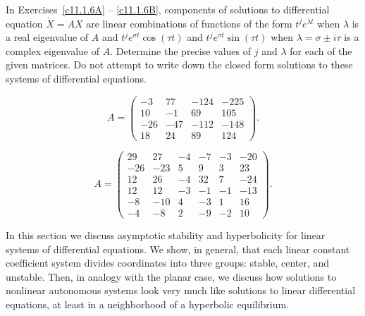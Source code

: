 In Exercises~\ref{c11.1.6A} -- \ref{c11.1.6B}, components of solutions to 
differential equation $\dot{X}=AX$ are linear combinations of functions of 
the form $t^je^{\lambda t}$ when $\lambda$ is a real eigenvalue of $A$ and 
$t^je^{\sigma t}\cos(\tau t)$ and $t^je^{\sigma t}\sin(\tau t)$ when
$\lambda=\sigma\pm i\tau$ is a complex eigenvalue of $A$.  Determine the
precise values of $j$ and $\lambda$ for each of the given matrices.  Do not
attempt to write down the closed form solutions to these systems of
differential equations.
\begin{exercise} \label{c11.1.6A}
\begin{equation*}
A=\left(\begin{array}{rrrr}  
   -3 &  77 & -124 & -225 \\
   10 &  -1 &   69 &  105 \\
  -26 & -47 & -112 & -148 \\
   18 &  24 &   89 &  124 \end{array} \right).
\end{equation*}
\end{exercise}
\begin{exercise} \label{c11.1.6B}
\begin{equation*}
A=\left(\begin{array}{rrrrrr}  
   29 &  27 &  -4 &  -7 &  -3 & -20 \\
  -26 & -23 &   5 &   9 &   3 &  23 \\
   12 &  26 &  -4 &  32 &   7 & -24 \\
   12 &  12 &  -3 &  -1 &  -1 & -13 \\
   -8 & -10 &   4 &  -3 &   1 &  16 \\
   -4 &  -8 &   2 &  -9 &  -2 &  10  \end{array} \right).
\end{equation*}
\end{exercise}



 
\label{S:QT}


In this section we discuss asymptotic stability and hyperbolicity for 
linear systems of differential equations.  We show, in general, that 
each linear constant coefficient system divides coordinates into three
groups: stable, center, and unstable.   Then, in analogy with the 
planar case, we discuss how solutions to nonlinear autonomous systems 
look very much like solutions to linear differential equations, at least
in a neighborhood of a hyperbolic equilibrium.


